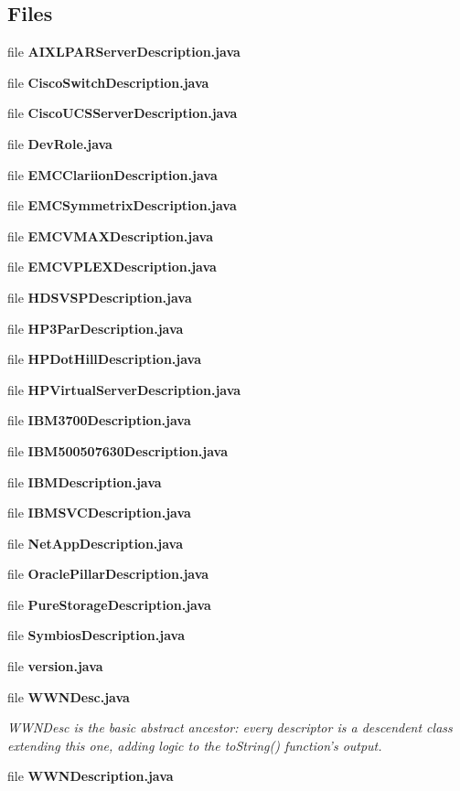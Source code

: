 \subsection*{Files}
\begin{DoxyCompactItemize}
\item 
file {\bfseries A\+I\+X\+L\+P\+A\+R\+Server\+Description.\+java}
\item 
file {\bfseries Cisco\+Switch\+Description.\+java}
\item 
file {\bfseries Cisco\+U\+C\+S\+Server\+Description.\+java}
\item 
file {\bf Dev\+Role.\+java}
\item 
file {\bf E\+M\+C\+Clariion\+Description.\+java}
\item 
file {\bf E\+M\+C\+Symmetrix\+Description.\+java}
\item 
file {\bf E\+M\+C\+V\+M\+A\+X\+Description.\+java}
\item 
file {\bf E\+M\+C\+V\+P\+L\+E\+X\+Description.\+java}
\item 
file {\bf H\+D\+S\+V\+S\+P\+Description.\+java}
\item 
file {\bf H\+P3\+Par\+Description.\+java}
\item 
file {\bf H\+P\+Dot\+Hill\+Description.\+java}
\item 
file {\bfseries H\+P\+Virtual\+Server\+Description.\+java}
\item 
file {\bf I\+B\+M3700\+Description.\+java}
\item 
file {\bf I\+B\+M500507630\+Description.\+java}
\item 
file {\bf I\+B\+M\+Description.\+java}
\item 
file {\bf I\+B\+M\+S\+V\+C\+Description.\+java}
\item 
file {\bf Net\+App\+Description.\+java}
\item 
file {\bf Oracle\+Pillar\+Description.\+java}
\item 
file {\bfseries Pure\+Storage\+Description.\+java}
\item 
file {\bf Symbios\+Description.\+java}
\item 
file {\bf version.\+java}
\item 
file {\bf W\+W\+N\+Desc.\+java}
\begin{DoxyCompactList}\small\item\em W\+W\+N\+Desc is the basic abstract ancestor\+: every descriptor is a descendent class extending this one, adding logic to the to\+String() function's output. \end{DoxyCompactList}\item 
file {\bf W\+W\+N\+Description.\+java}
\end{DoxyCompactItemize}
